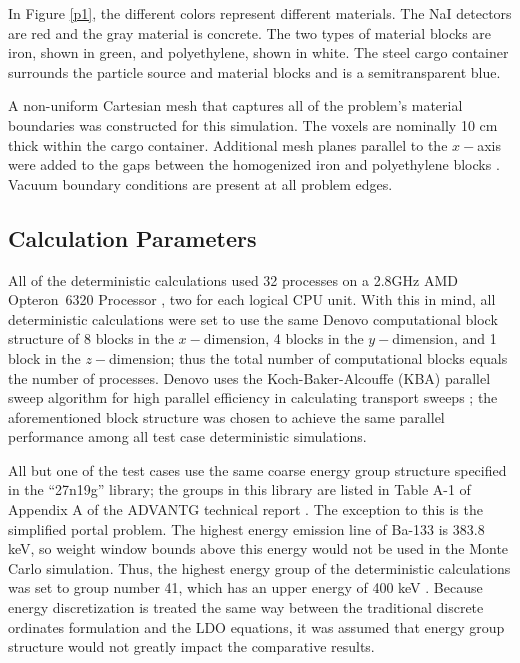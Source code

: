 \documentclass{article} %
\begin{document}
In Figure \ref{p1}, the different colors represent different materials. The NaI
detectors are red and the gray material is concrete. The two types of material
blocks are iron, shown in green, and polyethylene, shown in white. The steel
cargo container surrounds the particle source and material blocks and is a
semitransparent blue.

A non-uniform Cartesian mesh that captures all of the problem's material
boundaries was constructed for this simulation. The voxels are nominally 10 cm
thick within the cargo container. Additional mesh planes parallel to the
$x-$axis were added to the gaps between the homogenized iron and polyethylene
blocks \cite{advantg}. Vacuum boundary conditions are present at all problem
edges.

\subsection{Calculation Parameters}
\label{params}

All of the deterministic calculations used 32 processes on a 2.8GHz AMD 
Opteron\texttrademark\ 6320 Processor \cite{amd}, two for each logical CPU
unit. With this in mind, all deterministic calculations were set to use the
same Denovo computational block structure of 8 blocks in the $x-$dimension, 4
blocks in the $y-$dimension, and 1 block in the $z-$dimension;
thus the total number of computational blocks equals the number of processes.
Denovo uses the Koch-Baker-Alcouffe (KBA) parallel sweep algorithm for high
parallel efficiency in calculating transport sweeps \cite{denovo}; the
aforementioned block structure was chosen to achieve the same parallel
performance among all test case deterministic simulations. 

All but one of the test cases use the same coarse energy group structure
specified in the ``27n19g'' library; the groups in this library are listed in
Table A-1 of Appendix A of the ADVANTG technical report \cite{advantg}. The
exception to this is the simplified portal problem. The highest energy
emission line of Ba-133 is 383.8 keV, so weight window bounds above this
energy would not be used in the Monte Carlo simulation. Thus, the highest
energy group of the deterministic calculations was set to group number 41,
which has an upper energy of 400 keV \cite{advantg}. Because 
energy discretization is treated the same way between the traditional discrete 
ordinates formulation and the LDO equations, it was assumed that energy group 
structure would not greatly impact the comparative results.
\end{document}
